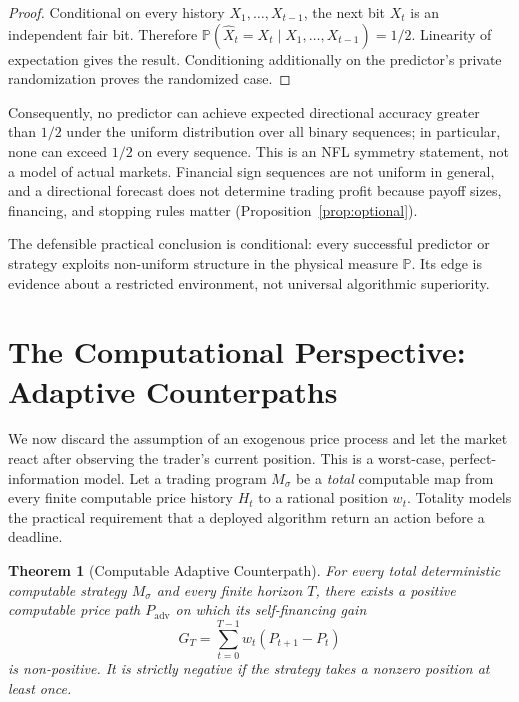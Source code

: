 \documentclass[aps,pra,reprint,superscriptaddress,amsmath,amssymb]{revtex4-2}
\theoremstyle{plain}
\newtheorem{theorem}{Theorem}
\theoremstyle{definition}
\theoremstyle{remark}
\begin{document}
\begin{proof}
Conditional on every history \(X_1,\ldots,X_{t-1}\), the next bit \(X_t\) is
an independent fair bit. Therefore
\(\mathbb{P}(\widehat X_t=X_t\mid X_1,\ldots,X_{t-1})=1/2\).
Linearity of expectation gives the result. Conditioning additionally on the
predictor's private randomization proves the randomized case.
\end{proof}

Consequently, no predictor can achieve expected directional accuracy greater
than \(1/2\) under the uniform distribution over all binary sequences; in
particular, none can exceed \(1/2\) on every sequence. This is an NFL symmetry
statement, not a model of actual markets. Financial sign sequences are not
uniform in general, and a directional forecast does not determine trading
profit because payoff sizes, financing, and stopping rules matter
(Proposition~\ref{prop:optional}).

The defensible practical conclusion is conditional: every successful
predictor or strategy exploits non-uniform structure in the physical measure
\(\mathbb{P}\). Its edge is evidence about a restricted environment, not
universal algorithmic superiority.

\section{The Computational Perspective: Adaptive Counterpaths}
\label{sec:computability}

We now discard the assumption of an exogenous price process and let the market
react after observing the trader's current position. This is a worst-case,
perfect-information model. Let a trading program \(M_\sigma\) be a
\emph{total} computable map from every finite computable price history \(H_t\)
to a rational position \(w_t\). Totality models the practical requirement that
a deployed algorithm return an action before a deadline.

\begin{theorem}[Computable Adaptive Counterpath]
  \label{thm:counterpath}
  For every total deterministic computable strategy \(M_\sigma\) and every
  finite horizon \(T\), there exists a positive computable price path
  \(P_{\mathrm{adv}}\) on which its self-financing gain
  \[
    G_T=\sum_{t=0}^{T-1}w_t(P_{t+1}-P_t)
  \]
  is non-positive. It is strictly negative if the strategy takes a nonzero
  position at least once.
\end{theorem}
\end{document}

